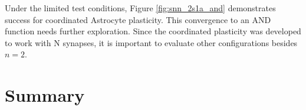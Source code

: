 Under the limited test conditions, Figure \ref{fig:snn_2s1a_and} demonstrates
success for coordinated Astrocyte plasticity. This convergence to an AND
function needs further exploration. Since the coordinated plasticity was
developed to work with N synapses, it is important to evaluate other
configurations besides $n=2$.



\section{Summary}


